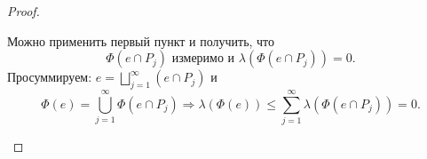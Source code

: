 \begin{proof}
\begin{description}
\begin{enumerate}
						Можно применить первый пункт и получить, что
						\[
							\Phi (e \cap P_j) \text{ измеримо и }  \lambda (\Phi (e \cap P_j)) = 0
						.\] 
						Просуммируем:
						$
							e = \bigsqcup_{j=1}^{\infty} (e \cap P_j) 
							$ и 
							\[
								\Phi (e) = \bigcup_{j=1}^{\infty} \Phi (e \cap P_j) \Longrightarrow \lambda (\Phi (e)) \le  \sum_{j=1}^{\infty} \lambda (\Phi (e \cap P_j)) = 0
							.\] 
			\end{enumerate} 
    \end{description} 
\end{proof}

